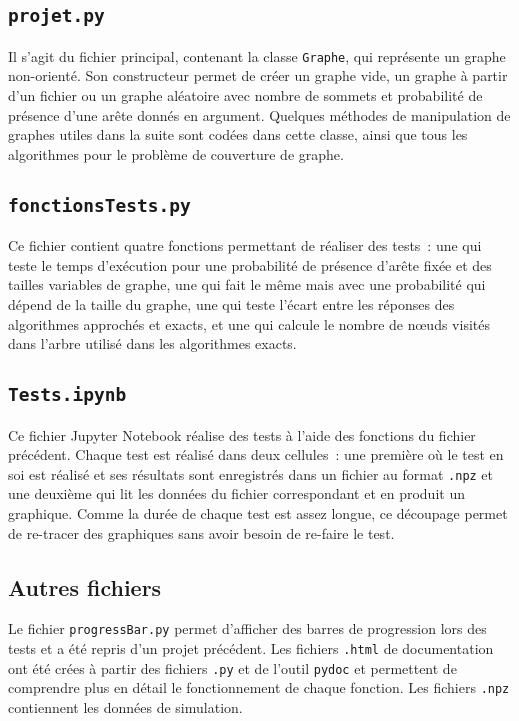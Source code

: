 \documentclass[a4paper,11pt]{amsart}
\theoremstyle{plain}
\begin{document}
\subsection{\texttt{projet.py}}

Il s'agit du fichier principal, contenant la classe \texttt{Graphe}, qui représente un graphe non-orienté. Son constructeur permet de créer un graphe vide, un graphe à partir d'un fichier ou un graphe aléatoire avec nombre de sommets et probabilité de présence d'une arête donnés en argument. Quelques méthodes de manipulation de graphes utiles dans la suite sont codées dans cette classe, ainsi que tous les algorithmes pour le problème de couverture de graphe.

\subsection{\texttt{fonctionsTests.py}}

Ce fichier contient quatre fonctions permettant de réaliser des tests~: une qui teste le temps d'exécution pour une probabilité de présence d'arête fixée et des tailles variables de graphe, une qui fait le même mais avec une probabilité qui dépend de la taille du graphe, une qui teste l'écart entre les réponses des algorithmes approchés et exacts, et une qui calcule le nombre de n\oe{}uds visités dans l'arbre utilisé dans les algorithmes exacts.

\subsection{\texttt{Tests.ipynb}}

Ce fichier Jupyter Notebook réalise des tests à l'aide des fonctions du fichier précédent. Chaque test est réalisé dans deux cellules~: une première où le test en soi est réalisé et ses résultats sont enregistrés dans un fichier au format \texttt{.npz} et une deuxième qui lit les données du fichier correspondant et en produit un graphique. Comme la durée de chaque test est assez longue, ce découpage permet de re-tracer des graphiques sans avoir besoin de re-faire le test.

\subsection{Autres fichiers}

Le fichier \texttt{progressBar.py} permet d'afficher des barres de progression lors des tests et a été repris d'un projet précédent. Les fichiers \texttt{.html} de documentation ont été crées à partir des fichiers \texttt{.py} et de l'outil \texttt{pydoc} et permettent de comprendre plus en détail le fonctionnement de chaque fonction. Les fichiers \texttt{.npz} contiennent les données de simulation.
\end{document}
